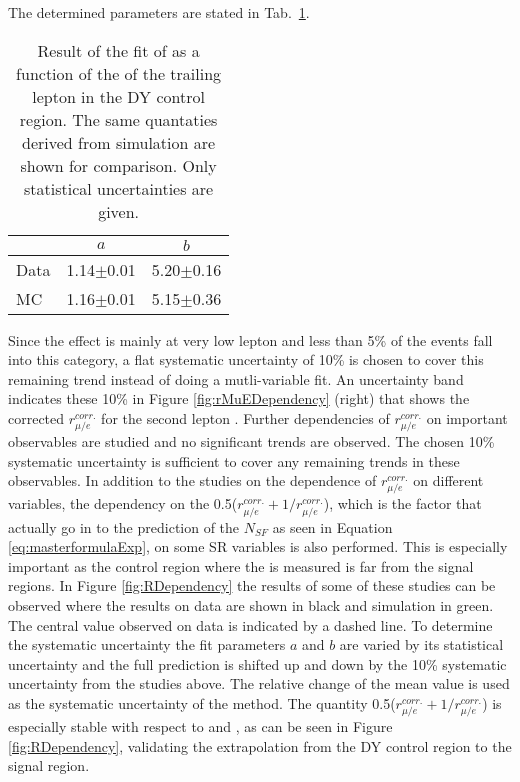 The determined parameters are stated in Tab.~\ref{tab:rMuEFitParameters}.

\begin{table}[ht!]
\def\arraystretch{1.2}
 \caption{Result of the fit of \rmue as a function of the \pt of the trailing lepton in the DY control region. 
 The same quantaties derived from simulation are shown for comparison. Only statistical uncertainties are given.}
   \label{tab:rMuEFitParameters}
    \begin{center}
        \begin{tabular}{ l c c }
        \hline \hline
    		& $a$ & $b$ \\\hline
        Data     &  1.14$\pm$0.01  &  5.20$\pm$0.16    \\
        MC       &  1.16$\pm$0.01  &  5.15$\pm$0.36    \\\hline\hline
\end{tabular}
\end{center}
\end{table}                                                                                                                                                                   


Since the effect is mainly at very low lepton \pt and less than 5\% of the events fall into this category, a flat systematic uncertainty of 10\% is chosen to cover this remaining trend 
instead of doing a mutli-variable fit. 
An uncertainty band indicates these 10\% in Figure \ref{fig:rMuEDependency} (right) that shows the corrected $r_{\mu/e}^{corr.}$ for the second lepton \pt. 
Further dependencies of $r_{\mu/e}^{corr.}$ on important observables are studied and no significant trends are observed. 
The chosen 10\% systematic uncertainty is sufficient to cover any remaining trends in these observables.
In addition to the studies on the dependence of $r_{\mu/e}^{corr.}$ on different variables, the dependency on the 0.5($r_{\mu/e}^{corr.}+1/r_{\mu/e}^{corr.}$), which is the factor that actually go in to the prediction of the $N_{SF}$ as seen in Equation \ref{eq:masterformulaExp}, on some SR variables is also performed. 
This is especially important as the control region where the \rmue is measured is far from the signal regions. 
In Figure \ref{fig:RDependency} the results of some of these studies can be observed where the results on data are shown in black and simulation in green. 
The central value observed on data is indicated by a dashed line. 
To determine the systematic uncertainty the fit parameters $a$ and $b$ are varied by its statistical uncertainty and the full prediction is shifted up and down by the 10\% systematic uncertainty from the studies above.
The relative change of the mean value is used as the systematic uncertainty of the method. 
The quantity 0.5($r_{\mu/e}^{corr.}+1/r_{\mu/e}^{corr.}$) is especially stable with respect to \ptmiss and \mttwo, as can be seen in Figure \ref{fig:RDependency}, validating the extrapolation from the DY control region to the signal region.   

